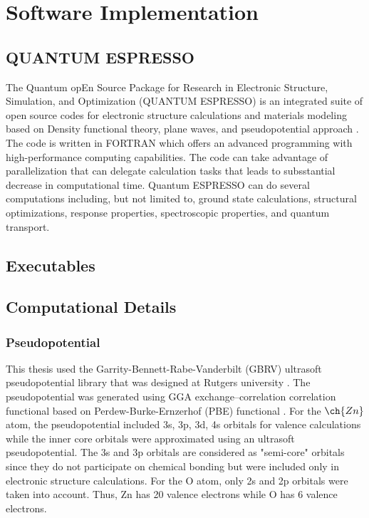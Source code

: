 \chapter{Software Implementation}
    \section{QUANTUM ESPRESSO}
    The Quantum opEn  Source  Package  for  Research  in  Electronic  Structure, Simulation, and Optimization (QUANTUM ESPRESSO) is an integrated suite of open source codes for electronic structure calculations and materials modeling based on Density functional theory, plane waves, and pseudopotential approach \citep{Giannozzi2009,Giannozzi2017}. The code is written in FORTRAN which offers an advanced programming with high-performance computing capabilities. The code can take advantage of parallelization that can delegate calculation tasks that leads to subsstantial decrease in computational time. Quantum ESPRESSO can do several computations including, but not limited to, ground state calculations, structural optimizations, response properties, spectroscopic properties, and quantum transport. 
    \section{Executables}

    \section{Computational Details}

    \subsection{Pseudopotential}
    This thesis used the Garrity-Bennett-Rabe-Vanderbilt (GBRV) ultrasoft pseudopotential library that was designed at Rutgers university \citep{Garrity2014}. The pseudopotential was generated using GGA exchange–correlation correlation functional based on Perdew-Burke-Ernzerhof (PBE) functional \citep{Perdew1996}. For the $\ch{Zn}$ atom, the pseudopotential included 3s, 3p, 3d, 4s orbitals for valence calculations  while the inner core orbitals were approximated using an ultrasoft pseudopotential. The 3s and 3p orbitals are considered as "semi-core" orbitals since they do not participate on chemical bonding but were included only in electronic structure calculations. For the O atom, only  2s and 2p orbitals were taken into account. Thus, Zn has 20 valence electrons while O has 6 valence electrons. 

